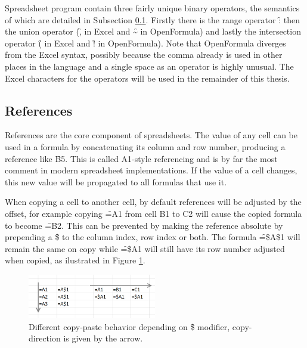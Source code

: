 Spreadsheet program contain three fairly unique binary operators, the semantics of which are detailed in Subsection \ref{sec:references}.
Firstly there is the range operator \f{:} then the union operator (\f{,} in Excel and \f{\textasciitilde} in OpenFormula) and lastly the intersection operator (\f{} in Excel and \f{!} in OpenFormula).
Note that OpenFormula diverges from the Excel syntax, possibly because the comma already is used in other places in the language and a single space as an operator is highly unusual.
The Excel characters for the operators will be used in the remainder of this thesis.

\subsection{References}
\label{sec:references}
References are the core component of spreadsheets.
The value of any cell can be used in a formula by concatenating its column and row number, producing a reference like \f{B5}.
This is called A1-style referencing and is by far the most comment in modern spreadsheet implementations.
If the value of a cell changes, this new value will be propagated to all formulas that use it.

When copying a cell to another cell, by default references will be adjusted by the offset, for example copying \f{=A1} from cell B1 to C2 will cause the copied formula to become \f{=B2}.
This can be prevented by making the reference absolute by prepending a \f{\$} to the column index, row index or both.
The formula \f{=\$A\$1} will remain the same on copy while \f{=\$A1} will still have its row number adjusted when copied, as ilustrated in Figure \ref{fig:copy-modifiers}.

\begin{figure}
\centerfloat
\includegraphics[width=0.5\textwidth]{anatomy/copying}
\caption{Different copy-paste behavior depending on \f{\$} modifier, copy-direction is given by the arrow.}
\label{fig:copy-modifiers}
\end{figure}


